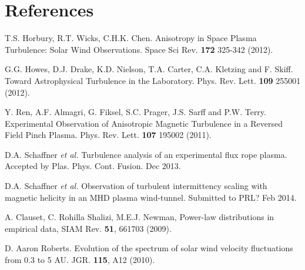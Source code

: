 \documentclass[aip,prl,amsmath,amssymb,reprint,superscriptaddress]{revtex4-1} %
\begin{document}
\section*{References}
\begin{thebibliography}{99}

 T.S. Horbury, R.T. Wicks, C.H.K. Chen. Anisotropy in Space Plasma Turbulence: Solar Wind Observations. Space Sci Rev. {\bf 172} 325-342 (2012).

 G.G. Howes, D.J. Drake, K.D. Nielson, T.A. Carter, C.A. Kletzing and F. Skiff. Toward Astrophysical Turbulence in the Laboratory. Phys. Rev. Lett. {\bf 109} 255001 (2012).

 Y. Ren, A.F. Almagri, G. Fiksel, S.C. Prager, J.S. Sarff and P.W. Terry. Experimental Observation of Anisotropic Magnetic Turbulence in a Reversed Field Pinch Plasma. Phys. Rev. Lett. {\bf 107} 195002 (2011).

 D.A. Schaffner {\it et al.} Turbulence analysis of an experimental flux rope plasma. Accepted by Plas. Phys. Cont. Fusion. Dec 2013.

 D.A. Schaffner {\it et al.} Observation of turbulent intermittency scaling with magnetic helicity in an MHD plasma wind-tunnel. Submitted to PRL? Feb 2014.

A. Clauset, C. Rohilla Shalizi, M.E.J. Newman, Power-law distributions in empirical data, SIAM Rev. {\bf 51}, 661703 (2009).

D. Aaron Roberts. Evolution of the spectrum of solar wind velocity fluctuations from 0.3 to 5 AU. JGR. {\bf 115}, A12 (2010).






\end{thebibliography}
\end{document}
